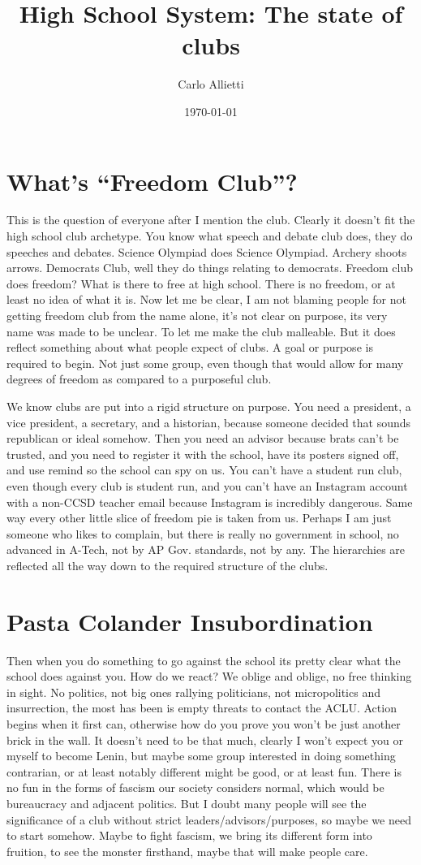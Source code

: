 \documentclass{article}
\title{High School System: The state of clubs}
\author{Carlo Allietti}
\date{\today}
\begin{document}
\maketitle
\section{What's ``Freedom Club''?}
This is the question of everyone after I mention the club. Clearly it doesn't fit the high school club archetype. You know what speech and debate club does, they do speeches and debates. Science Olympiad does Science Olympiad. Archery shoots arrows. Democrats Club, well they do things relating to democrats. Freedom club does freedom? What is there to free at high school. There is no freedom, or at least no idea of what it is. Now let me be clear, I am not blaming people for not getting freedom club from the name alone, it's not clear on purpose, its very name was made to be unclear. To let me make the club malleable. But it does reflect something about what people expect of clubs. A goal or purpose is required to begin. Not just some group, even though that would allow for many degrees of freedom as compared to a purposeful club.

We know clubs are put into a rigid structure on purpose. You need a president, a vice president, a secretary, and a historian, because someone decided that sounds republican or ideal somehow. Then you need an advisor because brats can't be trusted, and you need to register it with the school, have its posters signed off, and use remind so the school can spy on us. You can't have a student run club, even though every club is student run, and you can't have an Instagram account with a non-CCSD teacher email because Instagram is incredibly dangerous. Same way every other little slice of freedom pie is taken from us. Perhaps I am just someone who likes to complain, but there is really no government in school, no advanced in A-Tech, not by AP Gov. standards, not by any. The hierarchies are reflected all the way down to the required structure of the clubs.
\section{Pasta Colander Insubordination}
Then when you do something to go against the school its pretty clear what the school does against you. How do we react? We oblige and oblige, no free thinking in sight. No politics, not big ones rallying politicians, not micropolitics and insurrection, the most has been is empty threats to contact the ACLU. Action begins when it first can, otherwise how do you prove you won't be just another brick in the wall. It doesn't need to be that much, clearly I won't expect you or myself to become Lenin, but maybe some group interested in doing something contrarian, or at least notably different might be good, or at least fun. There is no fun in the forms of fascism our society considers normal, which would be bureaucracy and adjacent politics. But I doubt many people will see the significance of a club without strict leaders/advisors/purposes, so maybe we need to start somehow. Maybe to fight fascism, we bring its different form into fruition, to see the monster firsthand, maybe that will make people care.
\end{document}
